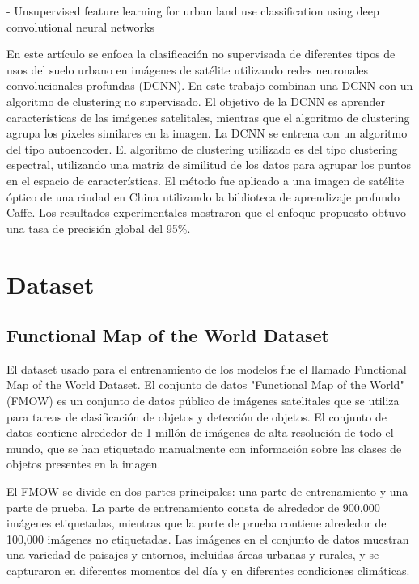 \documentclass[article]{llncs}
\begin{document}
- Unsupervised feature learning for urban land use classification using deep convolutional neural networks

  En este art\'iculo se enfoca la clasificación no supervisada de diferentes tipos de usos del suelo urbano en imágenes de satélite utilizando 
  redes neuronales convolucionales profundas (DCNN). En este trabajo combinan una DCNN con un algoritmo de clustering no 
  supervisado. El objetivo de la DCNN es aprender características de las imágenes satelitales, mientras que el algoritmo 
  de clustering agrupa los pixeles similares en la imagen. La DCNN se entrena con un algoritmo del tipo autoencoder. El 
  algoritmo de clustering utilizado es del tipo clustering espectral, utilizando una matriz de similitud de los datos 
  para agrupar los puntos en el espacio de características. El método fue aplicado a una imagen de satélite óptico de 
  una ciudad en China utilizando la biblioteca de aprendizaje profundo Caffe. Los resultados experimentales mostraron 
  que el enfoque propuesto obtuvo una tasa de precisión global del 95\%.


\section{Dataset}

\subsection{Functional Map of the World Dataset}

El dataset usado para el entrenamiento de los modelos fue el llamado Functional Map of the World Dataset. 
El conjunto de datos "Functional Map of the World" (FMOW) es un conjunto de datos público de imágenes satelitales 
que se utiliza para tareas de clasificación de objetos y detección de objetos. El conjunto de datos contiene alrededor 
de 1 millón de imágenes de alta resolución de todo el mundo, que se han etiquetado manualmente con información sobre 
las clases de objetos presentes en la imagen.

El FMOW se divide en dos partes principales: una parte de entrenamiento y una parte de prueba. La parte de entrenamiento 
consta de alrededor de 900,000 imágenes etiquetadas, mientras que la parte de prueba contiene alrededor de 100,000 
imágenes no etiquetadas. Las imágenes en el conjunto de datos muestran una variedad de paisajes y entornos, incluidas 
áreas urbanas y rurales, y se capturaron en diferentes momentos del día y en diferentes condiciones climáticas.
\end{document}
